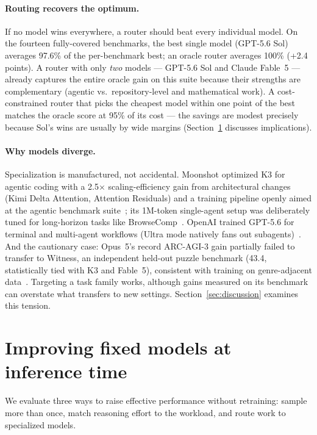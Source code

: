 \documentclass[11pt]{article}
\begin{document}
\paragraph{Routing recovers the optimum.} If no model wins everywhere, a router
should beat every individual model. On the fourteen fully-covered benchmarks,
the best single model (GPT-5.6 Sol) averages 97.6\% of the per-benchmark best;
an oracle router averages 100\% (+2.4 points). A router with only
\emph{two} models --- GPT-5.6 Sol and Claude Fable~5 --- already captures the
entire oracle gain on this suite because their strengths are complementary
(agentic vs.\ repository-level and mathematical work). A
cost-constrained router that picks the cheapest model within one point of the
best matches the oracle score at 95\% of its cost --- the savings are modest
precisely because Sol's wins are usually by wide margins
(Section~\ref{sec:improvements} discusses implications).

\paragraph{Why models diverge.} Specialization is manufactured, not
accidental. Moonshot optimized K3 for agentic coding with a 2.5$\times$
scaling-efficiency gain from architectural changes (Kimi Delta Attention,
Attention Residuals) and a training pipeline openly aimed at the agentic
benchmark suite~\cite{moonshot2026k3}; its 1M-token single-agent setup was
deliberately tuned for long-horizon tasks like
BrowseComp~\cite{moonshot2026k3}. OpenAI trained GPT-5.6 for terminal and
multi-agent workflows (Ultra mode natively fans out
subagents)~\cite{openai2026gpt56}. And the cautionary case: Opus~5's record
ARC-AGI-3 gain partially failed to transfer to Witness, an independent
held-out puzzle benchmark (43.4, statistically tied with K3 and Fable~5),
consistent with training on genre-adjacent data~\cite{decoder2026opus5,techtimes2026opus5}.
Targeting a task family works, although gains measured on its benchmark
can overstate what transfers to new settings. Section~\ref{sec:discussion}
examines this tension.

\section{Improving fixed models at inference time}\label{sec:improvements}

We evaluate three ways to raise effective performance without retraining:
sample more than once, match reasoning effort to the workload, and route work
to specialized models.
\end{document}

